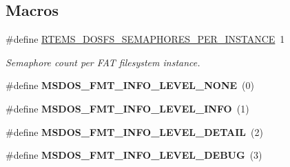 \subsection*{Macros}
\begin{DoxyCompactItemize}
\item 
\#define \mbox{\hyperlink{group__DOSFS_gaf5f22bc1798c9fd6a8f577ebd38aaa42}{R\+T\+E\+M\+S\+\_\+\+D\+O\+S\+F\+S\+\_\+\+S\+E\+M\+A\+P\+H\+O\+R\+E\+S\+\_\+\+P\+E\+R\+\_\+\+I\+N\+S\+T\+A\+N\+CE}}~1
\begin{DoxyCompactList}\small\item\em Semaphore count per F\+AT filesystem instance. \end{DoxyCompactList}\item 
\mbox{\label{group__DOSFS_gadbca2d92c455a1d790c18c3438b94b53}} 
\#define {\bfseries M\+S\+D\+O\+S\+\_\+\+F\+M\+T\+\_\+\+I\+N\+F\+O\+\_\+\+L\+E\+V\+E\+L\+\_\+\+N\+O\+NE}~(0)
\item 
\mbox{\label{group__DOSFS_ga6934cdd3173752954ac8cc822190acf1}} 
\#define {\bfseries M\+S\+D\+O\+S\+\_\+\+F\+M\+T\+\_\+\+I\+N\+F\+O\+\_\+\+L\+E\+V\+E\+L\+\_\+\+I\+N\+FO}~(1)
\item 
\mbox{\label{group__DOSFS_gad91890710b15a367a041f4d9e1efc9b2}} 
\#define {\bfseries M\+S\+D\+O\+S\+\_\+\+F\+M\+T\+\_\+\+I\+N\+F\+O\+\_\+\+L\+E\+V\+E\+L\+\_\+\+D\+E\+T\+A\+IL}~(2)
\item 
\mbox{\label{group__DOSFS_ga819bc56f5cd94de8ae14ae39eeb302e2}} 
\#define {\bfseries M\+S\+D\+O\+S\+\_\+\+F\+M\+T\+\_\+\+I\+N\+F\+O\+\_\+\+L\+E\+V\+E\+L\+\_\+\+D\+E\+B\+UG}~(3)
\end{DoxyCompactItemize}
